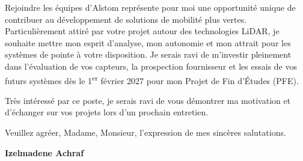 \documentclass[10pt,a4paper]{altacv}
\begin{document}
\vspace{0.4cm}

Rejoindre les équipes d'Alstom représente pour moi une opportunité unique de contribuer au développement de solutions de mobilité plus vertes. Particulièrement attiré par votre projet autour des technologies LiDAR, je souhaite mettre mon esprit d'analyse, mon autonomie et mon attrait pour les systèmes de pointe à votre disposition. Je serais ravi de m'investir pleinement dans l'évaluation de vos capteurs, la prospection fournisseur et les essais de vos futurs systèmes dès le 1\textsuperscript{er} février 2027 pour mon Projet de Fin d'Études (PFE).

\vspace{0.4cm}

Très intéressé par ce poste, je serais ravi de vous démontrer ma motivation et d'échanger sur vos projets lors d'un prochain entretien.

\vspace{0.5cm}

Veuillez agréer, Madame, Monsieur, l'expression de mes sincères salutations.

\vfill

\begin{flushright}
  \Large\color{emphasis}\textbf{Izelmadene Achraf}
\end{flushright}
\end{document}

